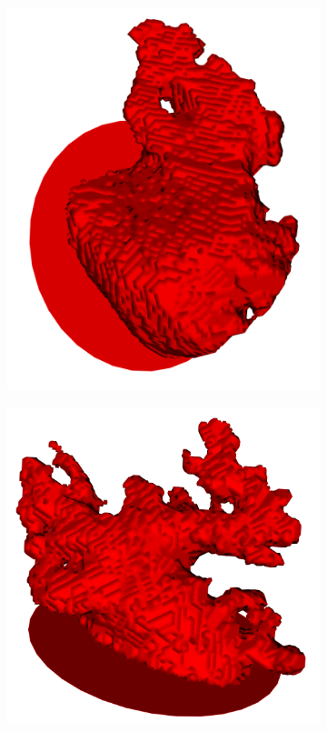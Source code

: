 \documentclass[review]{elsarticle}
\begin{document}
\begin{figure}[t]
\begin{subfigure}[b]{.12\linewidth}
    \includegraphics[width=\textwidth]{fig11_5.png}
  \end{subfigure}%
  \begin{subfigure}[b]{.12\linewidth}
    \centering
    \includegraphics[width=\textwidth]{fig11_6.png}

\end{subfigure}
\end{figure}
\end{document}
